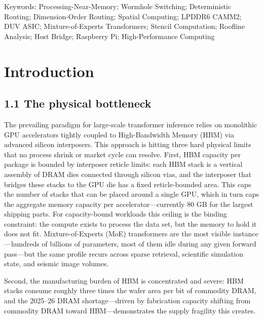 \documentclass[10pt,twocolumn]{article}
\begin{document}
Keywords: Processing-Near-Memory; Wormhole Switching; Deterministic Routing; Dimension-Order Routing; Spatial Computing; LPDDR6 CAMM2; DUV ASIC; Mixture-of-Experts Transformers; Stencil Computation; Roofline Analysis; Host Bridge; Raspberry Pi; High-Performance Computing

\section*{Introduction}\label{sec:introduction}

\subsection*{1.1 The physical bottleneck}\label{sec:1.1}

The prevailing paradigm for large-scale transformer inference relies on monolithic GPU accelerators tightly coupled to High-Bandwidth Memory (HBM) via advanced silicon interposers\cite{2,15}. This approach is hitting three hard physical limits that no process shrink or market cycle can resolve.\cite{1} First, HBM capacity per package is bounded by interposer reticle limits: each HBM stack is a vertical assembly of DRAM dies connected through silicon vias, and the interposer that bridges these stacks to the GPU die has a fixed reticle-bounded area\cite{15}. This caps the number of stacks that can be placed around a single GPU, which in turn caps the aggregate memory capacity per accelerator---currently 80 GB for the largest shipping parts. For capacity-bound workloads this ceiling is the binding constraint: the compute exists to process the data set, but the memory to hold it does not fit. Mixture-of-Experts (MoE) transformers are the most visible instance---hundreds of billions of parameters, most of them idle during any given forward pass\cite{3,4}---but the same profile recurs across sparse retrieval, scientific simulation state, and seismic image volumes.

Second, the manufacturing burden of HBM is concentrated and severe: HBM stacks consume roughly three times the wafer area per bit of commodity DRAM, and the 2025--26 DRAM shortage---driven by fabrication capacity shifting from commodity DRAM toward HBM---demonstrates the supply fragility this creates\cite{25}.
\end{document}
